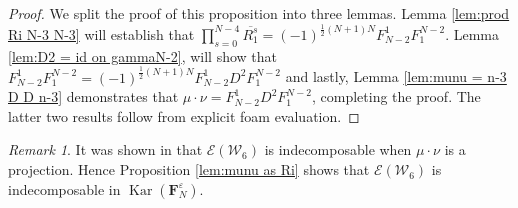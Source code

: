 \documentclass[12pt]{amsart}
\theoremstyle{definition}
\theoremstyle{remark}
\newtheorem{remark}[theorem]{Remark}
\numberwithin{equation}{section}
\numberwithin{figure}{section}
\newcommand{\Kar}{\operatorname{Kar}}
\newcommand{\Ri}[2]{\overline{R^{#1}_{#2}}}
\newcommand{\Wsix}{\mathcal{W}_6}
\newcommand{\Foam}{\mathbf{F}_N}
\begin{document}
\begin{proof}
We split the proof of this proposition into three lemmas. Lemma \ref{lem:prod Ri N-3 N-3} will establish that $\prod_{s = 0}^{N-4} \Ri{s}{1} = (-1)^{\frac{1}{2} (N +1)N} F_{N-2}^1 F_{1}^{N-2}$. Lemma \ref{lem:D2 = id on gammaN-2}, will show that $F_{N-2}^1 F_{1}^{N-2} = (-1)^{\frac{1}{2} (N +1)N} F_{N-2}^1 D^2 F_{1}^{N-2}$ and lastly, Lemma \ref{lem:munu = n-3 D D n-3} demonstrates that $\mu \cdot \nu = F_{N-2}^1 D^2 F_{1}^{N-2}$, completing the proof. The latter two results follow from explicit foam evaluation.
\end{proof}

\begin{remark}
    It was shown in \cite[Theorem 4.2]{grlj20266valentvertexmathfrakglnweb} that $\mathcal E(\Wsix)$ is indecomposable when $\mu \cdot \nu$ is a projection. Hence Proposition \ref{lem:munu as Ri} shows that $\mathcal E(\Wsix)$ is indecomposable in $\Kar(\Foam^\varepsilon)$.
\end{remark}
\end{document}
